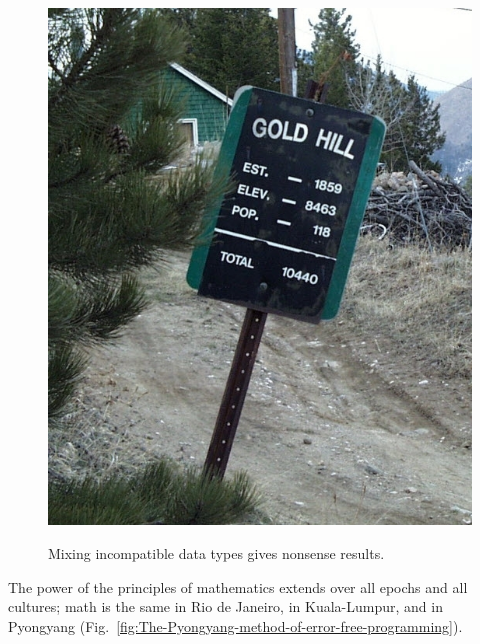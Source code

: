 \begin{figure}%
\begin{centering}
\vspace{-0.8\baselineskip}
{\footnotesize{}\includegraphics[width=1\linewidth]{type-error}\vspace{-0.7\baselineskip}
}{\footnotesize\par}
\par\end{centering}
{\footnotesize{}\caption{Mixing incompatible data types gives nonsense results.\label{fig:A-nonsensical-calculation}}
}{\footnotesize\par}

\vspace{-3\baselineskip}
\end{figure}%

The power of the principles of mathematics extends over all epochs
and all cultures; math is the same in Rio de Janeiro, in Kuala-Lumpur,
and in Pyongyang (Fig.\ \ref{fig:The-Pyongyang-method-of-error-free-programming}).


